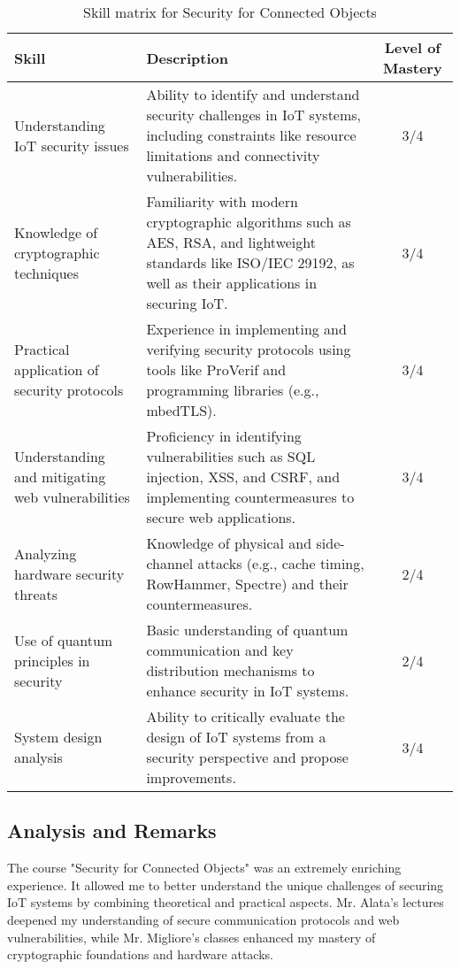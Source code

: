 \begin{table}[H]
    \centering
    \renewcommand{\arraystretch}{1.5} %
    \begin{tabular}{|>{\raggedright}p{3.5cm}|p{8cm}|c|}
    \hline
    \rowcolor[gray]{0.8}
    \textbf{Skill} & \textbf{Description} & \textbf{Level of Mastery} \\
    \hline
    Understanding IoT security issues & Ability to identify and understand security challenges in IoT systems, including constraints like resource limitations and connectivity vulnerabilities. & 3/4 \\
    \hline
    Knowledge of cryptographic techniques & Familiarity with modern cryptographic algorithms such as AES, RSA, and lightweight standards like ISO/IEC 29192, as well as their applications in securing IoT. & 3/4 \\
    \hline
    Practical application of security protocols & Experience in implementing and verifying security protocols using tools like ProVerif and programming libraries (e.g., mbedTLS). & 3/4 \\
    \hline
    Understanding and mitigating web vulnerabilities & Proficiency in identifying vulnerabilities such as SQL injection, XSS, and CSRF, and implementing countermeasures to secure web applications. & 3/4 \\
    \hline
    Analyzing hardware security threats & Knowledge of physical and side-channel attacks (e.g., cache timing, RowHammer, Spectre) and their countermeasures. & 2/4 \\
    \hline
    Use of quantum principles in security & Basic understanding of quantum communication and key distribution mechanisms to enhance security in IoT systems. & 2/4 \\
    \hline
    System design analysis & Ability to critically evaluate the design of IoT systems from a security perspective and propose improvements. & 3/4 \\
    \hline
    \end{tabular}
    \caption{Skill matrix for Security for Connected Objects}
    \label{table:skills-security-iot}
\end{table}

\subsection{Analysis and Remarks}
\indent \indent The course "Security for Connected Objects" was an extremely enriching experience. It allowed me to better understand the unique challenges of securing IoT systems by combining theoretical and practical aspects. Mr. Alata's lectures deepened my understanding of secure communication protocols and web vulnerabilities, while Mr. Migliore's classes enhanced my mastery of cryptographic foundations and hardware attacks.

